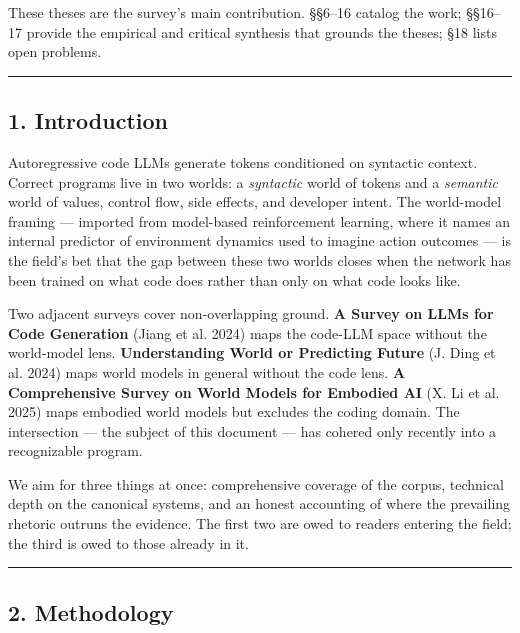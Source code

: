 \documentclass{article}
\begin{document}
These theses are the survey's main contribution. §§6--16 catalog the
work; §§16--17 provide the empirical and critical synthesis that grounds
the theses; §18 lists open problems.

\begin{center}\rule{0.5\linewidth}{0.5pt}\end{center}

\hypertarget{introduction}{%
\subsection{1. Introduction}\label{introduction}}

Autoregressive code LLMs generate tokens conditioned on syntactic
context. Correct programs live in two worlds: a \emph{syntactic} world
of tokens and a \emph{semantic} world of values, control flow, side
effects, and developer intent. The world-model framing --- imported from
model-based reinforcement learning, where it names an internal predictor
of environment dynamics used to imagine action outcomes --- is the
field's bet that the gap between these two worlds closes when the
network has been trained on what code does rather than only on what code
looks like.

Two adjacent surveys cover non-overlapping ground. \textbf{A Survey on
LLMs for Code Generation} (Jiang et al. 2024) maps the code-LLM space
without the world-model lens. \textbf{Understanding World or Predicting
Future} (J. Ding et al. 2024) maps world models in general without the
code lens. \textbf{A Comprehensive Survey on World Models for Embodied
AI} (X. Li et al. 2025) maps embodied world models but excludes the
coding domain. The intersection --- the subject of this document --- has
cohered only recently into a recognizable program.

We aim for three things at once: comprehensive coverage of the corpus,
technical depth on the canonical systems, and an honest accounting of
where the prevailing rhetoric outruns the evidence. The first two are
owed to readers entering the field; the third is owed to those already
in it.

\begin{center}\rule{0.5\linewidth}{0.5pt}\end{center}

\hypertarget{methodology}{%
\subsection{2. Methodology}\label{methodology}}
\end{document}
